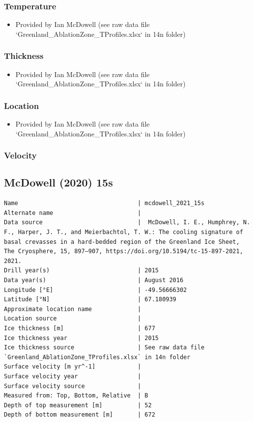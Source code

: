 \documentclass[article,a4paper,times,11pt,twoside]{article}
\begin{document}
\subsubsection{Temperature}
\label{sec:orgfaa830a}

\begin{itemize}
\item Provided by Ian McDowell (see raw data file `Greenland\_AblationZone\_TProfiles.xlsx` in 14n folder)
\end{itemize}

\subsubsection{Thickness}
\label{sec:org6db9386}

\begin{itemize}
\item Provided by Ian McDowell (see raw data file `Greenland\_AblationZone\_TProfiles.xlsx` in 14n folder)
\end{itemize}

\subsubsection{Location}
\label{sec:orgff900fd}

\begin{itemize}
\item Provided by Ian McDowell (see raw data file `Greenland\_AblationZone\_TProfiles.xlsx` in 14n folder)
\end{itemize}

\subsubsection{Velocity}
\label{sec:org8ebad74}
\clearpage
\subsection{McDowell (2020) 15s}
\label{sec:org95701ce}
\begin{verbatim}
Name                                  | mcdowell_2021_15s
Alternate name                        | 
Data source                           |  McDowell, I. E., Humphrey, N. F., Harper, J. T., and Meierbachtol, T. W.: The cooling signature of basal crevasses in a hard-bedded region of the Greenland Ice Sheet, The Cryosphere, 15, 897–907, https://doi.org/10.5194/tc-15-897-2021, 2021.
Drill year(s)                         | 2015
Data year(s)                          | August 2016
Longitude [°E]                        | -49.56666302
Latitude [°N]                         | 67.180939
Approximate location name             | 
Location source                       | 
Ice thickness [m]                     | 677
Ice thickness year                    | 2015
Ice thickness source                  | See raw data file `Greenland_AblationZone_TProfiles.xlsx` in 14n folder
Surface velocity [m yr^-1]            | 
Surface velocity year                 | 
Surface velocity source               | 
Measured from: Top, Bottom, Relative  | B
Depth of top measurement [m]          | 52
Depth of bottom measurement [m]       | 672
\end{verbatim}
\end{document}
